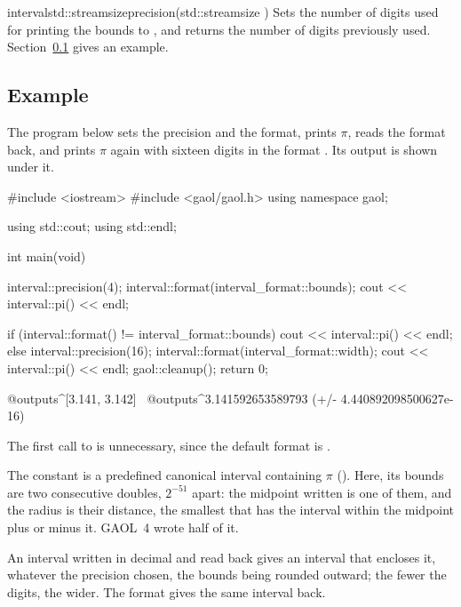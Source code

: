 \begin{defstaticmethod}{interval}{std::streamsize}{precision}{(std::streamsize )}
  Sets the number of digits used for printing the bounds to , and
  returns the number of digits previously used.
  Section~\ref{sec:output-example} gives an example.
\end{defstaticmethod}

\subsection{Example}\label{sec:output-example}

\begin{Ex}
The program below sets the precision and the format, prints $\pi$, reads
the format back, and prints $\pi$ again with sixteen digits in the format
. Its output is shown under it.
\begin{example}
#include <iostream>
#include <gaol/gaol.h>
using namespace gaol;

using std::cout;
using std::endl;

int main(void)
{
  interval::precision(4);
  interval::format(interval_format::bounds);
  cout << interval::pi() << endl;

  if (interval::format() != interval_format::bounds) {
    cout << interval::pi() << endl;
  } else {
    interval::precision(16);
    interval::format(interval_format::width);
    cout << interval::pi() << endl;
  }
  gaol::cleanup();
  return 0;
}
@outputs^[3.141, 3.142]~
@outputs^3.141592653589793 (+/- 4.440892098500627e-16)~
\end{example}
\end{Ex}

\noindent
The first call to  is unnecessary, since the
default format is .

The constant  is a predefined canonical interval
containing $\pi$ (). Here, its bounds are two
consecutive doubles, $2^{-51}$ apart: the midpoint written is one of them,
and the radius is their distance, the smallest that has the interval within
the midpoint plus or minus it.\newinvfive{} GAOL~4 wrote half of it.

\begin{Rem}
An interval written in decimal and read back gives an interval that
encloses it, whatever the precision chosen, the bounds being rounded
outward; the fewer the digits, the wider. The format  gives
the same interval back.
\end{Rem}

